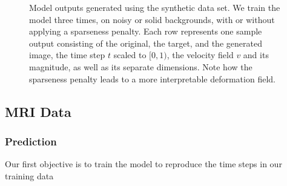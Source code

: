 \begin{figure}
	\centering
	
	\vspace*{-15pt}
	\caption{Model outputs generated using the synthetic data set. We train the model three times, on noisy or solid backgrounds, with or without applying a sparseness penalty. Each row represents one sample output consisting of the original, the target, and the generated image, the time step $t$ scaled to $[0, 1)$, the velocity field $v$ and its magnitude, as well as its separate dimensions. Note how the sparseness penalty leads to a more interpretable deformation field.} \label{fig:toydata}
\end{figure}


\subsection{MRI Data} %

\subsubsection*{Prediction}
Our first objective is to train the model to reproduce the time steps in our training data



